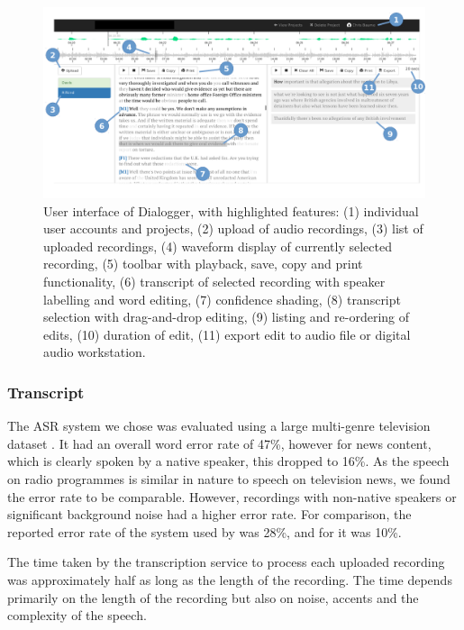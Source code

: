 \begin{figure}
  \centering
  \includegraphics[width=\textwidth]{figs/interface-labels}
  \caption[User interface of Dialogger.]{User interface of Dialogger, with highlighted
    features: (1) individual user accounts and projects, (2) upload of audio recordings, (3) list of uploaded
    recordings, (4) waveform display of currently selected recording, (5) toolbar with playback, save, copy and print
    functionality, (6) transcript of selected recording with speaker labelling and word editing, (7) confidence
  shading, (8) transcript selection with drag-and-drop editing, (9) listing and re-ordering of edits, (10) duration of
edit, (11) export edit to audio file or digital audio workstation.}
  \label{fig:interface}
\end{figure}

\subsubsection{Transcript}\label{sec:transcript}

The ASR system we chose was evaluated using a large multi-genre television dataset \citep{Bell2015}.  It had an overall
word error rate of 47\%, however for news content, which is clearly spoken by a native speaker, this dropped to 16\%.
As the speech on radio programmes is similar in nature to speech on television news, we found the error rate to be
comparable. However, recordings with non-native speakers or significant background noise had a higher error rate.  For
comparison, the reported error rate of the system used by \citet{Whittaker2004} was 28\%, and for \citet{Sivaraman2016}
it was 10\%.

The time taken by the transcription service to process each uploaded recording was approximately half as long as the
length of the recording. The time depends primarily on the length of the recording but also on noise, accents and the
complexity of the speech.

